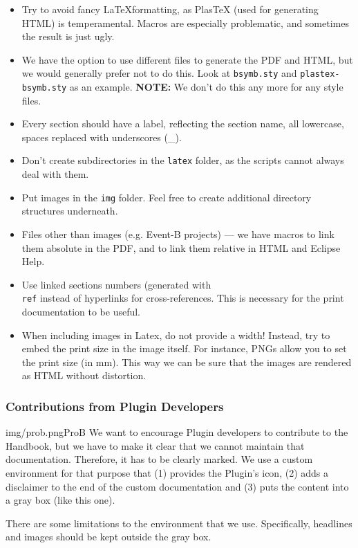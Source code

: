\begin{itemize}
	\item Try to avoid fancy \LaTeX formatting, as PlasTeX (used for generating HTML) is temperamental.  Macros are especially problematic, and sometimes the result is just ugly.
	\item We have the option to use different files to generate the PDF and HTML, but we would generally prefer not to do this.  Look at \texttt{bsymb.sty} and \texttt{plastex-bsymb.sty} as an example. \textbf{NOTE:} We don't do this any more for any style files.
	\item Every section should have a label, reflecting the section name, all lowercase, spaces replaced with underscores (\_).
	\item Don't create subdirectories in the \texttt{latex} folder, as the scripts cannot always deal with them.
	\item Put images in the \texttt{img} folder.  Feel free to create additional directory structures underneath.
	\item Files other than images (e.g. Event-B projects) --- we have macros to link them absolute in the PDF, and to link them relative in HTML and Eclipse Help.
	\item Use linked sections numbers (generated with \texttt{\\ref{}} instead of hyperlinks for cross-references. This is necessary for the print documentation to be useful.
	\item When including images in Latex, do not provide a width!  Instead, try to embed the print size in the image itself.  For instance, PNGs allow you to set the print size (in mm).  This way we can be sure that the images are rendered as HTML without distortion.
\end{itemize}

\subsubsection{Contributions from Plugin Developers}
\label{sec:plugin_contributions}

\begin{rodin-plugin}{img/prob.png}{ProB}
We want to encourage Plugin developers to contribute to the Handbook, but we have to make it clear that we cannot maintain that documentation.  Therefore, it has to be clearly marked.  We use a custom environment for that purpose that
(1) provides the Plugin's icon, (2) adds a disclaimer to the end of the custom documentation and (3) puts the content into a gray box (like this one).

There are some limitations to the environment that we use.  Specifically, headlines and images should be kept outside the gray box.

\end{rodin-plugin}

